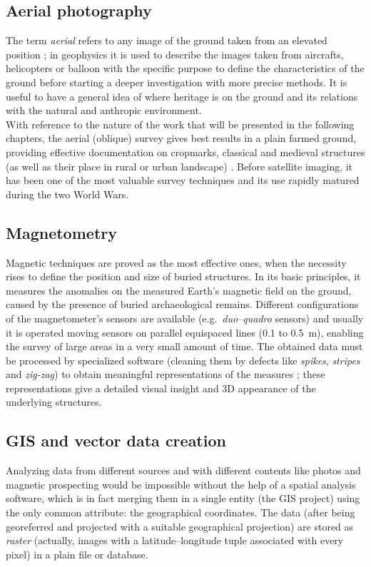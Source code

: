         \subsection{Aerial photography}
            The term \emph{aerial} refers to any image of the ground taken from an elevated position \cite[p.~452]{terrestrial-remote}; in geophysics it is used to describe the images taken from aircrafts, helicopters or balloon with the specific purpose to define the characteristics of the ground before starting a deeper investigation with more precise methods. It is useful to have a general idea of where heritage is on the ground and its relations with the natural and anthropic environment.\\
            With reference to the nature of the work that will be presented in the following chapters, the aerial (oblique) survey gives best results in a plain farmed ground, providing effective documentation on cropmarks, classical and medieval structures (as well as their place in rural or urban landscape) \cite[pp.~11--12]{arch-site-detection}. Before satellite imaging, it has been one of the most valuable survey techniques and its use rapidly matured during the two World Wars.
            
        \subsection{Magnetometry}
            Magnetic techniques are proved as the most effective ones, when the necessity rises to define the position and size of buried structures. In its basic principles, it measures the anomalies on the measured Earth's magnetic field on the ground, caused by the presence of buried archaeological remains. Different configurations of the magnetometer's sensors are available (e.g.\ \emph{duo--quadro} sensors) and usually it is operated moving sensors on parallel equispaced lines (\num{0.1} to \SI{0.5}{\meter}), enabling the survey of large areas in a very small amount of time. The obtained data must be processed by specialized software (cleaning them by defects like \emph{spikes}, \emph{stripes} and \emph{zig-zag}) to obtain meaningful representations of the measures \cite[p.~462]{terrestrial-remote}; these representations give a detailed visual insight and 3D appearance of the underlying structures.

        \subsection{GIS and vector data creation}
            Analyzing data from different sources and with different contents like photos and magnetic prospecting would be impossible without the help of a spatial analysis software, which is in fact merging them in a single entity (the GIS project) using the only common attribute: the geographical coordinates. The data (after being georeferred and projected with a suitable geographical projection) are stored as \emph{raster} (actually, images with a latitude--longitude tuple associated with every pixel) in a plain file or database.\\

